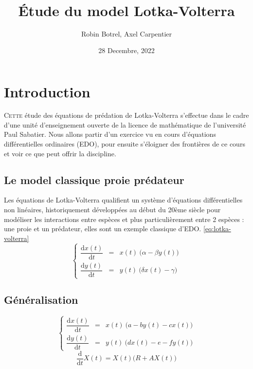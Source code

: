 \documentclass{wsdcr}
\title{Étude du model Lotka-Volterra}
\author{Robin Botrel, Axel Carpentier}
\affil{\textit{Université Paul Sabatier}\\
\textit{Toulouse, France}}
\date{28 Decembre, 2022}
\begin{document}
\maketitle
\tableofcontents
\section{Introduction}

\lettrine{C}{ette} étude des équations de prédation de Lotka-Volterra s'effectue dans le cadre d'une unité d'enseignement ouverte de la licence de mathématique de l'université Paul Sabatier. Nous allons partir d'un exercice vu en cours d'équations différentielles ordinaires (EDO), pour ensuite s'éloigner des frontières de ce cours et voir ce que peut offrir la discipline.



\subsection{Le model classique proie prédateur}

Les équations de Lotka-Volterra qualifient un système d'équations différentielles non linéaires, historiquement développées au début du 20ème siècle pour modéliser les interactions entre espèces et plus particulièrement entre 2 espèces : une proie et un prédateur, elles sont un exemple classique d'EDO. \ref{eq:lotka-volterra} \cite{lotka1920}
\begin{equation}
\left\{
{\begin{array}{ccc}{\dfrac {\mathrm {d} x(t)}{\mathrm {d} t}}&=&x(t)\ {\Big (}\alpha -\beta y(t){\Big )}\\{\dfrac {\mathrm {d} y(t)}{\mathrm {d} t}}&=&y(t)\ {\Big (}\delta x(t)-\gamma {\Big )}\end{array}}
\right.
\label{eq:lotka-volterra}
\end{equation}
\subsection{Généralisation}
\begin{equation}
\left\{
{\begin{array}{ccc}{\dfrac {\mathrm {d} x(t)}{\mathrm {d} t}}&=&x(t)\ {\Big (}a -b y(t)-c x(t){\Big )}\\{\dfrac {\mathrm {d} y(t)}{\mathrm {d} t}}&=&y(t)\ {\Big (}d x(t)-e -f y(t) {\Big )}\end{array}}
\right.
\end{equation}
\begin{equation}
\dfrac {\mathrm {d}}{\mathrm {d} t}X(t)=X(t) {\Big (}R+AX(t){\Big )}
\end{equation}
\end{document}
